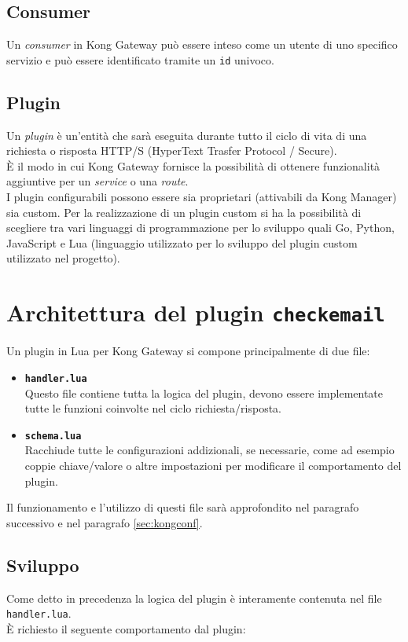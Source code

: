 \subsection{Consumer}\label{sec:kongconsumer}
Un \emph{consumer} in Kong Gateway può essere inteso come un utente di uno specifico servizio e può essere identificato tramite un \texttt{id} univoco. \cite{Kong}

\subsection{Plugin}\label{sec:kongplugin}
Un \emph{plugin} è un'entità che sarà eseguita durante tutto il ciclo di vita di una richiesta o risposta HTTP/S (HyperText Trasfer Protocol / Secure).\\
È il modo in cui Kong Gateway fornisce la possibilità di ottenere funzionalità aggiuntive per un \emph{service} o una \emph{route}.\\
I plugin configurabili possono essere sia proprietari (attivabili da Kong Manager) sia custom. Per la realizzazione di un plugin custom si ha la possibilità 
di scegliere tra vari linguaggi di programmazione per lo sviluppo quali Go, Python, JavaScript e Lua (linguaggio utilizzato per lo sviluppo 
del plugin custom utilizzato nel progetto). \cite{Kong}

\section{Architettura del plugin \texttt{checkemail}}\label{sec:architetturaplugin}
Un plugin in Lua per Kong Gateway si compone principalmente di due file:

\begin{itemize}
	\item \textbf{\texttt{handler.lua}}\\ Questo file contiene tutta la logica del plugin, devono essere implementate tutte le funzioni coinvolte nel ciclo richiesta/risposta.
	\item \textbf{\texttt{schema.lua}}\\ Racchiude tutte le configurazioni addizionali, se necessarie, come ad esempio coppie chiave/valore o altre impostazioni per modificare il comportamento del plugin.
\end{itemize}

Il funzionamento e l'utilizzo di questi file sarà approfondito nel paragrafo successivo e nel paragrafo \ref{sec:kongconf}.

\subsection{Sviluppo}\label{sec:sviluppoplugin}
Come detto in precedenza la logica del plugin è interamente contenuta nel file \texttt{handler.lua}.\\ 
È richiesto il seguente comportamento dal plugin:

